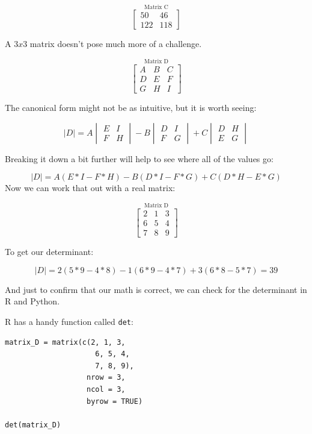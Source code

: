 \documentclass[
  letterpaper,
]{krantz}
\begin{document}
\[
\stackrel{\mbox{Matrix C}}{
\begin{bmatrix}
50 & 46\\
122 & 118
\end{bmatrix}
}
\]

A \(3x3\) matrix doesn't pose much more of a challenge.

\[
\stackrel{\mbox{Matrix D}}{
\begin{bmatrix}
A & B & C\\
D & E & F\\
G & H & I
\end{bmatrix}
}
\]

The canonical form might not be as intuitive, but it is worth seeing:

\[
\mid D \mid = A\begin{vmatrix}
E & I\\
F & H
\end{vmatrix}  - 
B\begin{vmatrix}
D & I\\
F & G
\end{vmatrix} + 
C\begin{vmatrix}
D & H\\
E & G
\end{vmatrix}
\]

Breaking it down a bit further will help to see where all of the values
go:

\[
\mid D \mid = A(E*I - F*H) - B(D*I - F*G) + C(D*H - E*G)
\] Now we can work that out with a real matrix:

\[
\stackrel{\mbox{Matrix D}}{
\begin{bmatrix}
2 & 1 & 3\\
6 & 5 & 4\\
7 & 8 & 9
\end{bmatrix}
}
\]

To get our determinant:

\[
\mid D \mid = 2(5*9 - 4*8) - 1(6*9 - 4*7) + 3(6*8 - 5*7) = 39
\]

And just to confirm that our math is correct, we can check for the
determinant in R and Python.

R has a handy function called \texttt{det}:

\begin{verbatim}
matrix_D = matrix(c(2, 1, 3,
                     6, 5, 4,
                     7, 8, 9), 
                   nrow = 3, 
                   ncol = 3, 
                   byrow = TRUE)

det(matrix_D)
\end{verbatim}
\end{document}
